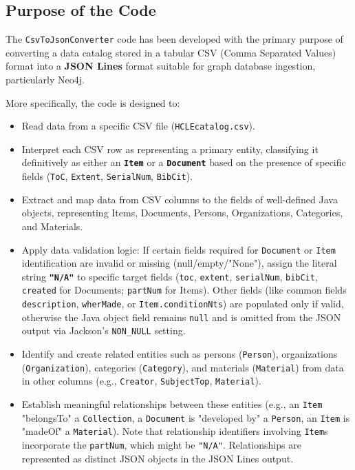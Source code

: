 \subsection{Purpose of the Code}
The \texttt{CsvToJsonConverter} code has been developed with the primary purpose of converting a data catalog stored in a tabular CSV (Comma Separated Values) format into a \textbf{JSON Lines} format suitable for graph database ingestion, particularly Neo4j.

More specifically, the code is designed to:
\begin{itemize}
    \item Read data from a specific CSV file (\texttt{HCLEcatalog.csv}).
    \item Interpret each CSV row as representing a primary entity, classifying it definitively as either an \textbf{\texttt{Item}} or a \textbf{\texttt{Document}} based on the presence of specific fields (\texttt{ToC}, \texttt{Extent}, \texttt{SerialNum}, \texttt{BibCit}).
    \item Extract and map data from CSV columns to the fields of well-defined Java objects, representing Items, Documents, Persons, Organizations, Categories, and Materials.
    \item Apply data validation logic: If certain fields required for \texttt{Document} or \texttt{Item} identification are invalid or missing (null/empty/"None"), assign the literal string \textbf{\texttt{"N/A"}} to specific target fields (\texttt{toc}, \texttt{extent}, \texttt{serialNum}, \texttt{bibCit}, \texttt{created} for Documents; \texttt{partNum} for Items). Other fields (like common fields \texttt{description}, \texttt{wherMade}, or \texttt{Item.conditionNts}) are populated only if valid, otherwise the Java object field remains \texttt{null} and is omitted from the JSON output via Jackson's \texttt{NON\_NULL} setting.
    \item Identify and create related entities such as persons (\texttt{Person}), organizations (\texttt{Organization}), categories (\texttt{Category}), and materials (\texttt{Material}) from data in other columns (e.g., \texttt{Creator}, \texttt{SubjectTop}, \texttt{Material}).
    \item Establish meaningful relationships between these entities (e.g., an \texttt{Item} "belongsTo" a \texttt{Collection}, a \texttt{Document} is "developed by" a \texttt{Person}, an \texttt{Item} is "madeOf" a \texttt{Material}). Note that relationship identifiers involving \texttt{Item}s incorporate the \texttt{partNum}, which might be \texttt{"N/A"}. Relationships are represented as distinct JSON objects in the JSON Lines output.

\end{itemize}

